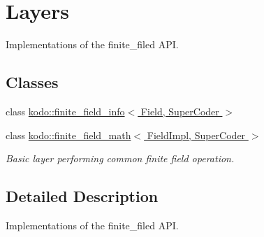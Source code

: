 \hypertarget{group__finite__field__layers}{\section{Layers}
\label{group__finite__field__layers}
}


Implementations of the finite\-\_\-filed A\-P\-I.  


\subsection*{Classes}
\begin{DoxyCompactItemize}
\item 
class \hyperlink{classkodo_1_1finite__field__info}{kodo\-::finite\-\_\-field\-\_\-info$<$ Field, Super\-Coder $>$}
\item 
class \hyperlink{classkodo_1_1finite__field__math}{kodo\-::finite\-\_\-field\-\_\-math$<$ Field\-Impl, Super\-Coder $>$}
\begin{DoxyCompactList}\small\item\em Basic layer performing common finite field operation. \end{DoxyCompactList}\end{DoxyCompactItemize}


\subsection{Detailed Description}
Implementations of the finite\-\_\-filed A\-P\-I. 